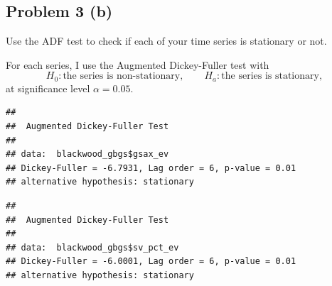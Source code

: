 \documentclass[
  10pt,
]{extarticle}
\newenvironment{Shaded}{\begin{snugshade}}{\end{snugshade}}
\newcommand{\CommentTok}[1]{\textcolor[rgb]{0.56,0.35,0.01}{\textit{#1}}}
\newcommand{\FunctionTok}[1]{\textcolor[rgb]{0.13,0.29,0.53}{\textbf{#1}}}
\newcommand{\NormalTok}[1]{#1}
\newcommand{\SpecialCharTok}[1]{\textcolor[rgb]{0.81,0.36,0.00}{\textbf{#1}}}
\begin{document}
\newpage

\subsection{Problem 3 (b)}\label{problem-3-b}

\begin{problem}[Problem 3 (b)]
Use the ADF test to check if each of your time series is stationary or not.
\end{problem}

For each series, I use the Augmented Dickey-Fuller test with
\[
H_0: \text{the series is non-stationary}, \qquad
H_a: \text{the series is stationary},
\]
at significance level \(\alpha = 0.05\).

\begin{Shaded}
\end{Shaded}

\begin{verbatim}
## 
##  Augmented Dickey-Fuller Test
## 
## data:  blackwood_gbgs$gsax_ev
## Dickey-Fuller = -6.7931, Lag order = 6, p-value = 0.01
## alternative hypothesis: stationary
\end{verbatim}

\begin{Shaded}
\end{Shaded}

\begin{verbatim}
## 
##  Augmented Dickey-Fuller Test
## 
## data:  blackwood_gbgs$sv_pct_ev
## Dickey-Fuller = -6.0001, Lag order = 6, p-value = 0.01
## alternative hypothesis: stationary
\end{verbatim}

\begin{Shaded}
\end{Shaded}
\end{document}

